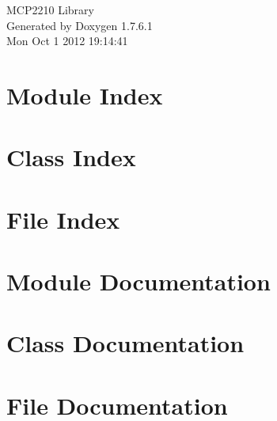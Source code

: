\documentclass[a4paper]{book}
\begin{document}
\hypersetup{pageanchor=false,citecolor=blue}
\begin{titlepage}
\vspace*{7cm}
\begin{center}
{\Large \-M\-C\-P2210 \-Library }\\
\vspace*{1cm}
{\large \-Generated by Doxygen 1.7.6.1}\\
\vspace*{0.5cm}
{\small Mon Oct 1 2012 19:14:41}\\
\end{center}
\end{titlepage}
\clearemptydoublepage
{}
\tableofcontents
\clearemptydoublepage
{}
\hypersetup{pageanchor=true,citecolor=blue}
\chapter{\-Module \-Index}

\chapter{\-Class \-Index}

\chapter{\-File \-Index}

\chapter{\-Module \-Documentation}

\chapter{\-Class \-Documentation}











\chapter{\-File \-Documentation}






\printindex
\end{document}

